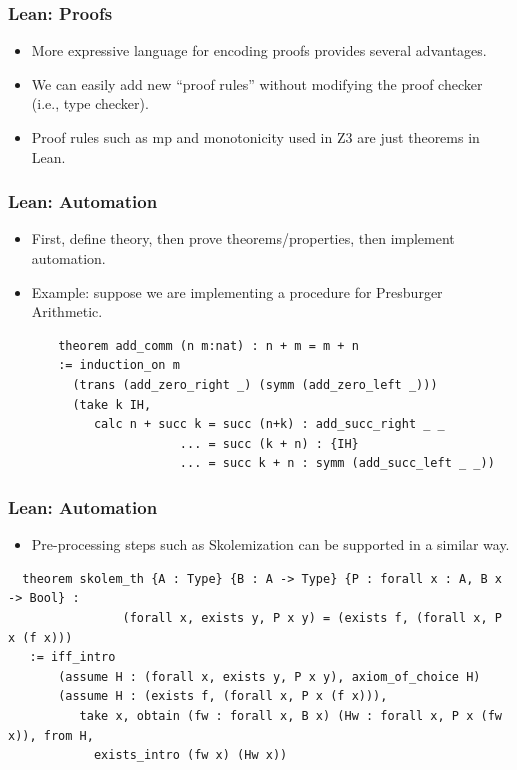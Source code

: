 \documentclass[svgnames,table,mathserif]{beamer}
\begin{document}
\begin{frame}
\frametitle{Lean: Proofs}
  \begin{itemize}
  \item More expressive language for encoding proofs provides several
advantages.
  \item {\color{red} We can easily add new ``proof rules'' without
modifying the proof checker} (i.e., type checker).
  \item Proof rules such as {\color{red} mp} and {\color{red} monotonicity} used in Z3 are just theorems in Lean.
  \end{itemize}
\end{frame}

\begin{frame}[fragile]
\frametitle{Lean: Automation}
  \begin{itemize}
  \item First, define theory, then prove theorems/properties, then implement automation.
  \item Example: suppose we are implementing a procedure for Presburger Arithmetic.
  \end{itemize}

{\tiny
\begin{verbatim}
       theorem add_comm (n m:nat) : n + m = m + n
       := induction_on m
         (trans (add_zero_right _) (symm (add_zero_left _)))
         (take k IH,
            calc n + succ k = succ (n+k) : add_succ_right _ _
                        ... = succ (k + n) : {IH}
                        ... = succ k + n : symm (add_succ_left _ _))
\end{verbatim}
}
\end{frame}

\begin{frame}[fragile]
\frametitle{Lean: Automation}
  \begin{itemize}
  \item Pre-processing steps such as Skolemization can be supported in
a similar way.
  \end{itemize}

{\scriptsize
\begin{verbatim}
  theorem skolem_th {A : Type} {B : A -> Type} {P : forall x : A, B x -> Bool} :
                (forall x, exists y, P x y) = (exists f, (forall x, P x (f x)))
   := iff_intro
       (assume H : (forall x, exists y, P x y), axiom_of_choice H)
       (assume H : (exists f, (forall x, P x (f x))),
          take x, obtain (fw : forall x, B x) (Hw : forall x, P x (fw x)), from H,
            exists_intro (fw x) (Hw x))
\end{verbatim}
}
\end{frame}
\end{document}
